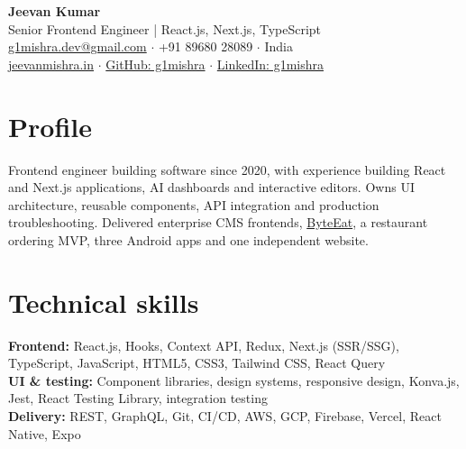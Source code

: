 \documentclass[a4paper,10pt]{article}
\begin{document}
\begin{center}
{\LARGE\textbf{Jeevan Kumar}}\\[3pt]
Senior Frontend Engineer | React.js, Next.js, TypeScript\\[3pt]
\href{mailto:g1mishra.dev@gmail.com}{g1mishra.dev@gmail.com} $\cdot$ +91 89680 28089 $\cdot$ India\\[2pt]
\href{https://jeevanmishra.in}{jeevanmishra.in} $\cdot$ \href{https://github.com/g1mishra}{GitHub: g1mishra} $\cdot$ \href{https://linkedin.com/in/g1mishra}{LinkedIn: g1mishra}
\end{center}
\section{Profile}
Frontend engineer building software since 2020, with experience building React and Next.js applications, AI dashboards and interactive editors. Owns UI architecture, reusable components, API integration and production troubleshooting. Delivered enterprise CMS frontends, \href{https://byteeat.vercel.app}{ByteEat}, a restaurant ordering MVP, three Android apps and one independent website.
\section{Technical skills}
\textbf{Frontend:} React.js, Hooks, Context API, Redux, Next.js (SSR/SSG), TypeScript, JavaScript, HTML5, CSS3, Tailwind CSS, React Query\\ \textbf{UI \& testing:} Component libraries, design systems, responsive design, Konva.js, Jest, React Testing Library, integration testing\\ \textbf{Delivery:} REST, GraphQL, Git, CI/CD, AWS, GCP, Firebase, Vercel, React Native, Expo
\end{document}
